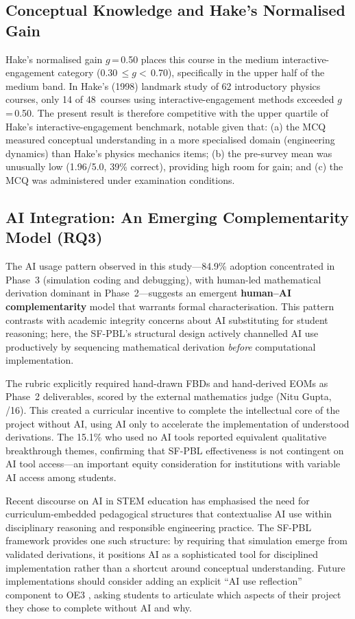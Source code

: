 \documentclass[utf8]{FrontiersinHarvard}
\begin{document}
\subsection{Conceptual Knowledge and Hake's Normalised Gain}

Hake's normalised gain $g$\,=\,0.50 places this course in the medium
interactive-engagement category \citep{hake1998interactive} (0.30\,$\leq g
<$\,0.70), specifically in the upper half of the medium band. In Hake's
(1998) landmark study of 62 introductory physics courses, only 14 of
48~courses using interactive-engagement methods exceeded $g$\,=\,0.50. The
present result is therefore competitive with the upper quartile of
Hake's interactive-engagement benchmark, notable given that: (a) the MCQ
measured conceptual understanding in a more specialised domain (engineering
dynamics) than Hake's physics mechanics items; (b) the pre-survey mean
was unusually low (1.96/5.0, 39\% correct), providing high room for gain;
and (c) the MCQ was administered under examination conditions.

\subsection{AI Integration: An Emerging Complementarity Model (RQ3)}

The AI usage pattern observed in this study---84.9\% adoption concentrated
in Phase~3 (simulation coding and debugging), with human-led mathematical
derivation dominant in Phase~2---suggests an emergent
\textbf{human--AI complementarity} model that warrants formal characterisation.
This pattern contrasts with academic integrity concerns about AI substituting
for student reasoning; here, the SF-PBL's structural design actively
channelled AI use productively by sequencing mathematical derivation
\textit{before} computational implementation.

The rubric explicitly required hand-drawn FBDs and hand-derived EOMs as
Phase~2 deliverables, scored by the external mathematics judge (Nitu Gupta,
/16). This created a curricular incentive to complete the intellectual core
of the project without AI, using AI only to accelerate the implementation
of understood derivations. The 15.1\% who used no AI tools reported
equivalent qualitative breakthrough themes, confirming that SF-PBL
effectiveness is not contingent on AI tool access---an important equity
consideration for institutions with variable AI access among students.

Recent discourse on AI in STEM education \citep{tlili2023chatgpt,
farrokhnia2024swot, nanade2026aiethics} has emphasised the need for
curriculum-embedded pedagogical structures that contextualise AI use within
disciplinary reasoning and responsible engineering practice. The SF-PBL
framework provides one such structure: by requiring that simulation emerge from
validated derivations, it positions AI as a sophisticated tool for
disciplined implementation rather than a shortcut around conceptual
understanding. Future implementations should consider adding an explicit
``AI use reflection'' component to OE3 \citep{nanade2026aiethics}, asking
students to articulate which aspects of their project they chose to complete
without AI and why.
\end{document}
